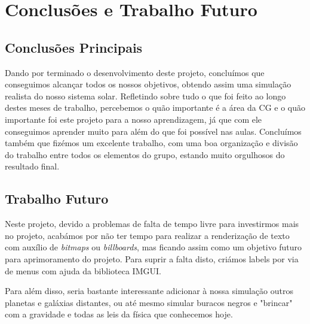 \chapter{Conclusões e Trabalho Futuro}
\label{chap:conc-trab-futuro}

\section{Conclusões Principais}
\label{sec:conc-princ}

Dando por terminado o desenvolvimento deste projeto, concluímos que conseguimos alcançar todos os nossos objetivos, obtendo assim uma simulação realista do nosso sistema solar. Refletindo sobre tudo o que foi feito ao longo destes meses de trabalho, percebemos o quão importante é a área da \ac{CG} e o quão importante foi este projeto para a nosso aprendizagem, já que com ele conseguimos aprender muito para além do que foi possível nas aulas.
Concluímos também que fizémos um excelente trabalho, com uma boa organização e divisão do trabalho entre todos os elementos do grupo, estando muito orgulhosos do resultado final.

\section{Trabalho Futuro}
\label{sec:trab-futuro}

Neste projeto, devido a problemas de falta de tempo livre para investirmos mais no projeto, acabámos por não ter tempo para realizar a renderização de texto com auxílio de \textit{bitmaps} ou \textit{billboards}, mas ficando assim como um objetivo futuro para aprimoramento do projeto. Para suprir a falta disto, criámos labels por via de menus com ajuda da biblioteca \ac{IMGUI}.

\noindent
Para além disso, seria bastante interessante adicionar à nossa simulação outros planetas e galáxias distantes, ou até mesmo simular buracos negros e "brincar" com a gravidade e todas as leis da física que conhecemos hoje.